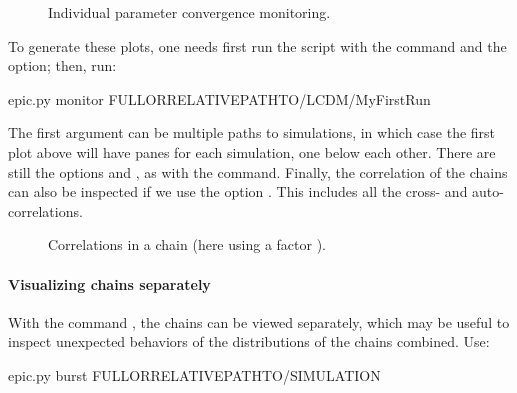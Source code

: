 \documentclass[letterpaper,12pt,english]{sphinxhowto}
\begin{document}
\begin{figure}[!tb]
\centering
\capstart

\noindent{}
\caption{Individual parameter convergence monitoring.}\label{\detokenize{MCMC:id13}}\end{figure}

To generate these plots, one needs first run the script with the command
 and the  option; then, run:

%
\begin{sphinxVerbatim}[commandchars=\\\{\}]
\PYGZdl{} epic.py monitor \PYGZlt{}FULL\PYGZhy{}OR\PYGZhy{}RELATIVE\PYGZhy{}PATH\PYGZhy{}TO\PYGZgt{}/LCDM/MyFirstRun
\end{sphinxVerbatim}

The first argument can be multiple paths to simulations, in which case the
first plot above will have panes for each simulation, one below each other.
There are still the options  and , as with the 
command.
Finally, the correlation of the chains can also be inspected if we use the
option .
This includes all the cross- and auto-correlations.

\begin{figure}[!tb]
\centering
\capstart

\noindent{}
\caption{Correlations in a chain (here using a factor ).}\label{\detokenize{MCMC:id14}}\end{figure}


\paragraph{Visualizing chains separately}
\label{\detokenize{MCMC:visualizing-chains-separately}}
With the command , the chains can be viewed separately, which may be
useful to inspect unexpected behaviors of the distributions of the chains
combined.
Use:

%
\begin{sphinxVerbatim}[commandchars=\\\{\}]
\PYGZdl{} epic.py burst \PYGZlt{}FULL\PYGZhy{}OR\PYGZhy{}RELATIVE\PYGZhy{}PATH\PYGZhy{}TO\PYGZgt{}/\PYGZlt{}SIMULATION\PYGZgt{}
\end{sphinxVerbatim}
\end{document}
